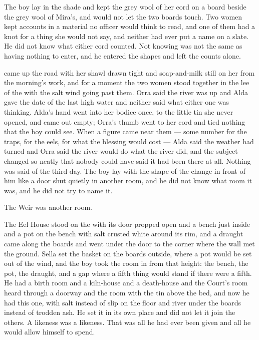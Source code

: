 The boy lay in the shade and kept the grey wool of her cord on a board beside the grey wool of Mira's, and would not let the two boards touch. Two women kept accounts in a material no officer would think to read, and one of them had a knot for a thing she would not say, and neither had ever put a name on a slate. He did not know what either cord counted. Not knowing was not the same as having nothing to enter, and he entered the shapes and left the counts alone.

 came up the road with her shawl drawn tight and soap-and-milk still on her from the morning's work, and for a moment the two women stood together in the lee of the  with the salt wind going past them. Orra said the river was up and Alda gave the date of the last high water and neither said what either one was thinking. Alda's hand went into her bodice once, to the little tin she never opened, and came out empty; Orra's thumb went to her cord and tied nothing that the boy could see. When a figure came near them --- some number for the traps, for the eels, for what the blessing would cost --- Alda said the weather had turned and Orra said the river would do what the river did, and the subject changed so neatly that nobody could have said it had been there at all. Nothing was said of the third day. The boy lay with the shape of the change in front of him like a door shut quietly in another room, and he did not know what room it was, and he did not try to name it.

\scenebreak

The Weir was another room.

The Eel House stood on the  with its door propped open and a bench just inside and a pot on the bench with salt crusted white around its rim, and a draught came along the boards and went under the door to the corner where the wall met the ground. Sella set the basket on the boards outside, where a pot would be set out of the wind, and the boy took the room in from that height: the bench, the pot, the draught, and a gap where a fifth thing would stand if there were a fifth. He had a birth room and a kiln-house and a death-house and the Court's room heard through a doorway and the room with the tin above the bed, and now he had this one, with salt instead of slip on the floor and river under the boards instead of trodden ash. He set it in its own place and did not let it join the others. A likeness was a likeness. That was all he had ever been given and all he would allow himself to spend.


